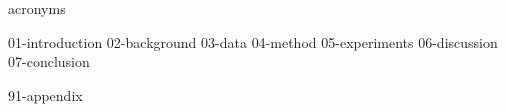 \documentclass[a4paper,oneside,10pt,ngerman,english]{scrbook}
\begin{document}
\cleardoubleoddpage
{acronyms}


\mainmatter


{01-introduction}
{02-background}
{03-data}
{04-method}
{05-experiments}
{06-discussion}
{07-conclusion}


\cleardoubleoddpage
\printbibliography

\appendix


{91-appendix}


\cleardoubleoddpage
\end{document}
